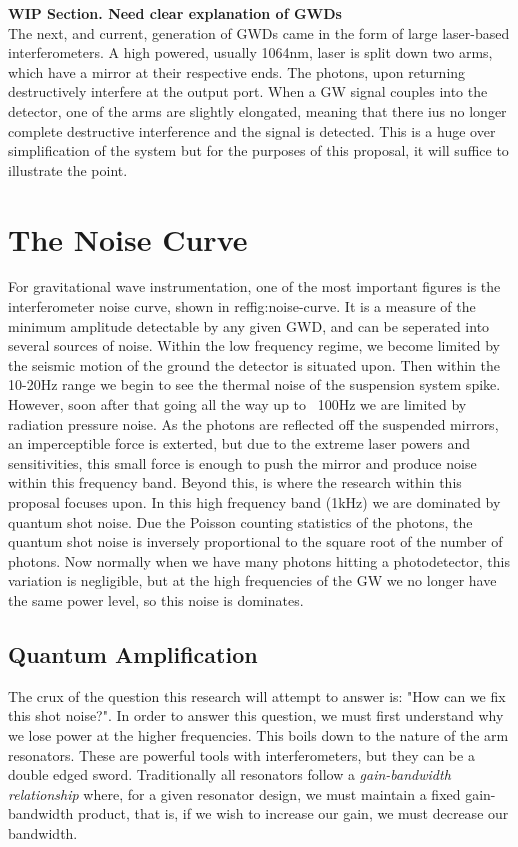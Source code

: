 \documentclass[11pt]{article}
\begin{document}
    \par
    \textbf{WIP Section. Need clear explanation of GWDs}\\
    The next, and current, generation of GWDs came in the form of large laser-based interferometers. A high powered, usually 1064nm, laser is split down two arms, which have a mirror at their respective ends. The photons, upon returning destructively interfere at the output port. When a GW signal couples into the detector, one of the arms are slightly elongated, meaning that there ius no longer complete destructive interference and the signal is detected. This is a huge over simplification of the system but for the purposes of this proposal, it will suffice to illustrate the point. 

\section{The Noise Curve}
    \label{sec:noise-curve}
    For gravitational wave instrumentation, one of the most important figures is the interferometer noise curve, shown in ref{fig:noise-curve}. It is a measure of the minimum amplitude detectable by any given GWD, and can be seperated into several sources of noise. Within the low frequency regime, we become limited by the seismic motion of the ground the detector is situated upon. Then within the 10-20Hz range we begin to see the thermal noise of the suspension system spike. However, soon after that going all the way up to ~100Hz we are limited by radiation pressure noise. As the photons are reflected off the suspended mirrors, an imperceptible force is exterted, but due to the extreme laser powers and sensitivities, this small force is enough to push the mirror and produce noise within this frequency band. Beyond this, is where the research within this proposal focuses upon. In this high frequency band (1kHz) we are dominated by quantum shot noise. Due the Poisson counting statistics of the photons, the quantum shot noise is inversely proportional to the square root of the number of photons. Now normally when we have many photons hitting a photodetector, this variation is negligible, but at the high frequencies of the GW we no longer have the same power level, so this noise is dominates. 
    \subsection{Quantum Amplification}
    The crux of the question this research will attempt to answer is: "How can we fix this shot noise?". In order to answer this question, we must first understand why we lose power at the higher frequencies. This boils down to the nature of the arm resonators. These are powerful tools with interferometers, but they can be a double edged sword. Traditionally all resonators follow a \textit{gain-bandwidth relationship} where, for a given resonator design, we must maintain a fixed gain-bandwidth product, that is, if we wish to increase our gain, we must decrease our bandwidth. 
\end{document}
